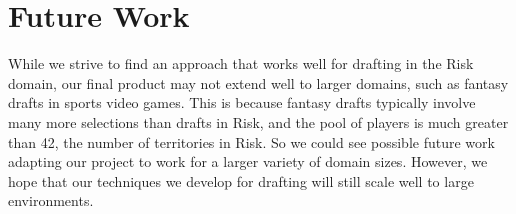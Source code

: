 \documentclass[letterpaper]{article}
\numberwithin{equation}{section}
\numberwithin{theorem}{section}
\numberwithin{lemma}{section}
\numberwithin{df}{section}
\begin{document}

\section{Future Work}

While we strive to find an approach that works well for drafting in the Risk domain, our final product may not extend well to larger domains, such as fantasy drafts in sports video games.  This is because fantasy drafts typically involve many more selections than drafts in Risk, and the pool of players is much greater than 42, the number of territories in Risk.  So we could see possible future work adapting our project to work for a larger variety of domain sizes.  However, we hope that our techniques we develop for drafting will still scale well to large environments.  




%

%
%


\end{document}
